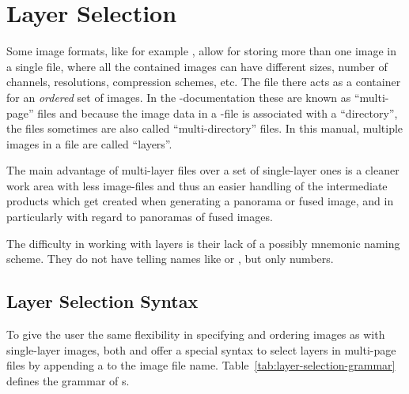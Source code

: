 

\section[Layer Selection\commonpart]{Layer Selection\commonpart
  \label{sec:layer-selection}
  }

Some image formats, like for example , allow for storing
more than one image in a single file, where all the contained images
can have different sizes, number of channels, resolutions, compression
schemes, etc.  The file there acts as a container for an
\emph{ordered} set of images.  In the -documentation
these are known as
``multi-page''%
 files and because the image data in a
-file is associated with a
``directory'', the files
sometimes are also called ``multi-directory'' files.  In this manual,
multiple images in a file are called
``layers''.

The main advantage of multi-layer files over a set of single-layer
ones is a cleaner work area with less image-files and thus an easier
handling of the intermediate products which get created when
generating a panorama or fused image, and in particularly with regard
to panoramas of fused images.

The difficulty in working with layers is their lack of a possibly
mnemonic naming scheme.  They do not have telling names like
 or , but only numbers.


\subsection[Layer Selection Syntax]{Layer Selection Syntax
  \label{sec:layer-selection-syntax}
  }

To give the user the same flexibility in specifying and ordering
images as with single-layer images, both \App{} and \OtherApp{} offer
a special syntax to select layers in multi-page files by appending a
 to the image file name.
Table~\ref{tab:layer-selection-grammar} defines the grammar of
\/s.

